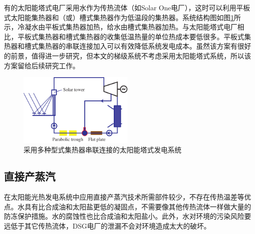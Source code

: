有的太阳能塔式电厂采用水作为传热流体（如Solar One电厂），这时可以利用平板式太阳能集热器和（或）槽式集热器作为低温段的集热器。系统结构图如图\ref{fig:seriesCollection}所示，冷凝水由平板式集热器加热，给水由槽式集热器加热。与太阳能塔式电厂相比，平板式集热器和槽式集热器的收集低温热量的单位热成本要低很多。平板式集热器和槽式集热器的串联连接加入可以有效降低系统发电成本。虽然该方案有很好的前景，值得进一步研究，但本文的梯级系统不考虑采用太阳能塔式系统，所以该方案留给后续研究工作。

\begin{figure}[!ht]
\centering 
\includegraphics[width=0.5\textwidth]{fig/SeriesCollection}
\caption{采用多种型式集热器串联连接的太阳能塔式发电系统}\label{fig:seriesCollection}
\end{figure}

\subsection{直接产蒸汽}
在太阳能光热发电系统中应用直接产蒸汽技术所需部件较少，不存在传热温差等优点。水具有比合成油和太阳盐更低的凝固点，不需要像其他传热流体一样做大量的防冻保护措施。水的腐蚀性也比合成油和太阳盐小\cite{Giglio2017}。此外，水对环境的污染风险要远低于其它传热流体，DSG电厂的泄漏不会对环境造成太大的破坏\cite{Fernandez2010}。


